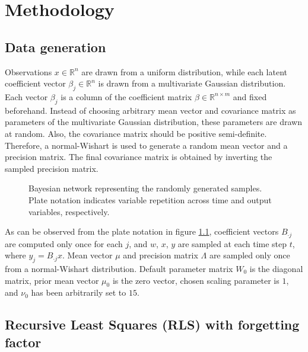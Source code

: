 \chapter{Methodology}

\section{Data generation}

  Observations $x \in \mathbb{R}^n$ are drawn from a uniform distribution,
  while each latent coefficient vector $\beta_j \in \mathbb{R}^n$
  is drawn from a multivariate Gaussian distribution.
  Each vector $\beta_j$ is a column of the coefficient
  matrix $\beta \in \mathbb{R}^{n \times m}$ and fixed beforehand.
  Instead of choosing arbitrary mean vector and covariance
  matrix as parameters of the multivariate Gaussian distribution,
  these parameters are drawn at random. Also, the covariance matrix
  should be positive semi-definite. Therefore, a normal-Wishart
  is used to generate a random mean vector and a precision matrix.
  The final covariance matrix is obtained by inverting the sampled
  precision matrix.

  \begin{figure}[ht]
    \begin{center}
      \resizebox{.85\textwidth}{!}{
        
      }
    \end{center}
    \caption{Bayesian network representing the randomly generated samples.
        Plate notation indicates variable repetition across time and
        output variables, respectively.}
    \label{bayesnet}
  \end{figure}

  As can be observed from the plate notation in figure \ref{bayesnet},
  coefficient vectors $B_{\cdot j}$ are computed only once for each $j$,
  and $w$, $x$, $y$ are sampled at each time step $t$, where $y_j = B_{\cdot j} x$.
  Mean vector $\mu$ and precision matrix $\Lambda$ are sampled only once
  from a normal-Wishart distribution.
  Default parameter matrix $W_0$ is the diagonal matrix, prior mean vector $\mu_0$
  is the zero vector, chosen scaling parameter is $1$, and $\nu_0$ has been
  arbitrarily set to $15$.


\section{Recursive Least Squares (RLS) with forgetting factor}

